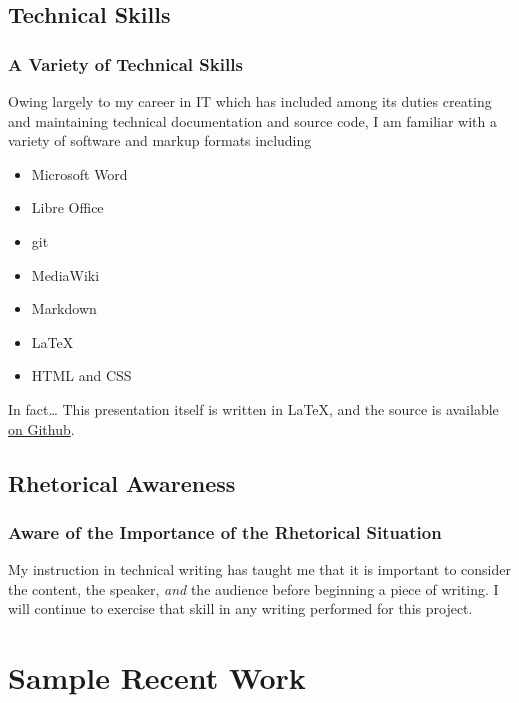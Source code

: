 \documentclass{beamer}
\begin{document}
\subsection{Technical Skills}
\begin{frame}
  \frametitle{A Variety of Technical Skills}
  Owing largely to my career in IT which has included among its duties
  creating and maintaining technical documentation and source code, I am
  familiar with a variety of software and markup formats including
  \begin{itemize}
    \item Microsoft Word
    \item Libre Office
    \item git
    \item MediaWiki
    \item Markdown
    \item \LaTeX
    \item HTML and CSS
  \end{itemize}
  \begin{alertblock}{In fact\ldots}
    This presentation itself is written in \LaTeX, and the source is available
    \href{http://github.com/werebus/ENGIN351-proposal}{on Github}.
  \end{alertblock}
\end{frame}

\subsection{Rhetorical Awareness}
\begin{frame}
  \frametitle{Aware of the Importance of the Rhetorical Situation}
  My instruction in technical writing has taught me that it is important to
  consider the content, the speaker, \emph{and} the audience before beginning
  a piece of writing.  I will continue to exercise that skill in any writing
  performed for this project.
\end{frame}

\section{Sample Recent Work}
\end{document}
